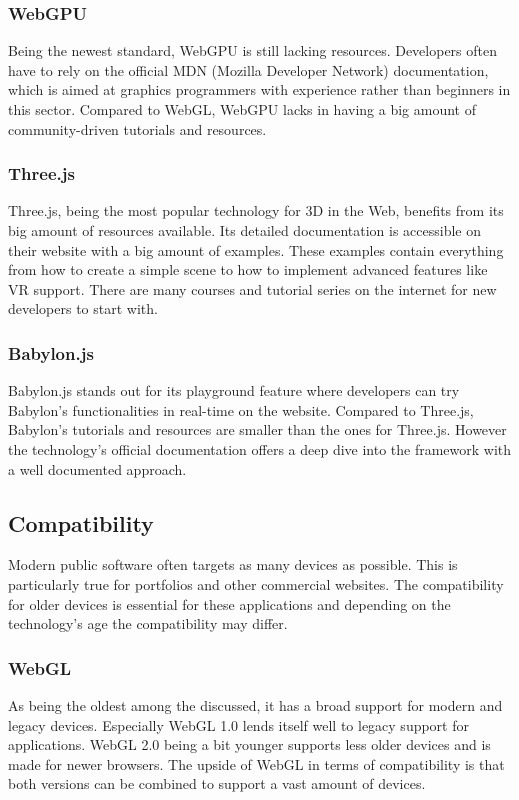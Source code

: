\subsubsection{WebGPU}
Being the newest standard, WebGPU is still lacking resources. Developers often have to rely on the official MDN (Mozilla Developer Network) documentation, which is aimed at graphics programmers with experience rather than beginners in this sector. Compared to WebGL, WebGPU lacks in having a big amount of community-driven tutorials and resources.

\subsubsection{Three.js}
Three.js, being the most popular technology for 3D in the Web, benefits from its big amount of resources available. Its detailed documentation is accessible on their website with a big amount of examples. These examples contain everything from how to create a simple scene to how to implement advanced features like VR support. There are many courses and tutorial series on the internet for new developers to start with.

\subsubsection{Babylon.js}
Babylon.js stands out for its playground feature where developers can try Babylon's functionalities in real-time on the website. Compared to Three.js, Babylon's tutorials and resources are smaller than the ones for Three.js. However the technology's official documentation offers a deep dive into the framework with a well documented approach.

\subsection{Compatibility}
Modern public software often targets as many devices as possible. This is particularly true for portfolios and other commercial websites. The compatibility for older devices is essential for these applications and depending on the technology's age the compatibility may differ.

\subsubsection{WebGL}
As being the oldest among the discussed, it has a broad support for modern and legacy devices. Especially WebGL 1.0 lends itself well to legacy support for applications. WebGL 2.0 being a bit younger supports less older devices and is made for newer browsers. The upside of WebGL in terms of compatibility is that both versions can be combined to support a vast amount of devices.

